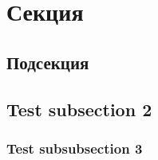 \documentclass[]{yktsat-datasheet}
\begin{document}


\newpage

\tableofcontents

\newpage


\lipsum[3]

\lipsum[2]

\newpage

\section{Секция}
\subsection{Подсекция}

\newpage

\subsection{Test subsection 2}

\lipsum[1]

\lipsum[1]

\lipsum[1]

\lipsum[1]

\lipsum[1]

\lipsum[1]

\lipsum[1]

\lipsum[5]

\subsubsection{Test subsubsection 3}

\lipsum[1]

\lipsum[5]

\lipsum[5]

\lipsum[5]

\lipsum[1]

\lipsum[5]

\lipsum[5]

\lipsum[5]

\lipsum[1]

\lipsum[5]

\lipsum[5]

\lipsum[5]
\end{document}
